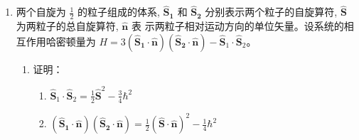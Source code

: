 \begin{enumerate}


\item 
两个自旋为 $\frac{1}{2}$ 的粒子组成的体系, $\hat{\boldsymbol{S}}_{\mathbf{1}}$ 和 $\hat{\boldsymbol{S}}_{\mathbf{2}}$ 分别表示两个粒子的自旋算符, $\hat{\boldsymbol{S}}$ 为两粒子的总自旋算符, $\hat{\boldsymbol{n}}$ 表 示两粒子相对运动方向的单位矢量。设系统的相互作用哈密顿量为 $H=3\left(\hat{\boldsymbol{S}}_{\mathbf{1}} \cdot \hat{\boldsymbol{n}}\right)\left(\hat{\boldsymbol{S}}_{\mathbf{2}} \cdot \hat{\boldsymbol{n}}\right)-\hat{\boldsymbol{S}}_{1} \cdot \hat{\boldsymbol{S}}_{2}$。
\begin{enumerate}
	\item
	证明：
	\begin{enumerate}
		\item
		$\hat{\boldsymbol{S}}_{1} \cdot \hat{\boldsymbol{S}}_{2}=\frac{1}{2} \hat{\boldsymbol{S}}^{2}-\frac{3}{4} \hbar^{2}$
		\item 
		$\left(\hat{\boldsymbol{S}}_{\mathbf{1}} \cdot \hat{\boldsymbol{n}}\right)\left(\hat{\boldsymbol{S}}_{\mathbf{2}} \cdot \hat{\boldsymbol{n}}\right)=\frac{1}{2}(\hat{\boldsymbol{S}} \cdot \hat{\boldsymbol{n}})^{2}-\frac{1}{4} \hbar^{2}$
		

\end{enumerate}
\end{enumerate}
\end{enumerate}
